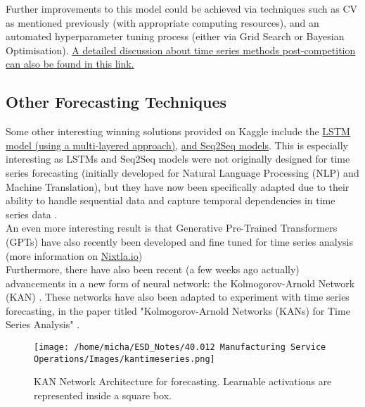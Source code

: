 \documentclass[12pt]{article}
\begin{document}
\noindent Further improvements to this model could be achieved via techniques such as CV as mentioned previously (with appropriate computing resources), and an automated hyperparameter tuning process (either via Grid Search or Bayesian Optimisation). \href{https://www.kaggle.com/c/m5-forecasting-accuracy/discussion/166814}{A detailed discussion about time series methods post-competition can also be found in this link.}

\subsection*{Other Forecasting Techniques}

Some other interesting winning solutions provided on Kaggle include the \href{https://www.kaggle.com/code/omershect/learning-pytorch-lstm-deep-learning-with-m5-data}{LSTM model (using a multi-layered approach)}, \href{https://www.kaggle.com/code/omershect/learning-pytorch-seq2seq-with-m5-data-set}{and Seq2Seq models}. This is especially interesting as LSTMs and Seq2Seq models were not originally designed for time series forecasting (initially developed for Natural Language Processing (NLP) and Machine Translation), but they have now been specifically adapted due to their ability to handle sequential data and capture temporal dependencies in time series data \cite{Olah_2015}. \\ 

\noindent An even more interesting result is that Generative Pre-Trained Transformers (GPTs) have also recently been developed and fine tuned for time series analysis \cite{garza2023timegpt1} \cite{liao2024timegpt} (more information on \href{https://docs.nixtla.io/}{Nixtla.io}) \\

\noindent Furthermore, there have also been recent (a few weeks ago actually) advancements in a new form of neural network: the Kolmogorov-Arnold Network (KAN) \cite{liu2024kan}. These networks have also been adapted to experiment with time series forecasting, in the paper titled "Kolmogorov-Arnold Networks (KANs) for Time Series Analysis" \cite{vacarubio2024kolmogorovarnold}. 

\begin{figure}[H]
    \centering
    \texttt{[image: /home/micha/ESD\_Notes/40.012 Manufacturing Service Operations/Images/kantimeseries.png]}
    \caption{KAN Network Architecture for forecasting. Learnable activations are represented inside a square box.}
    \label{fig:6-kannetwork}
\end{figure} 
\end{document}
